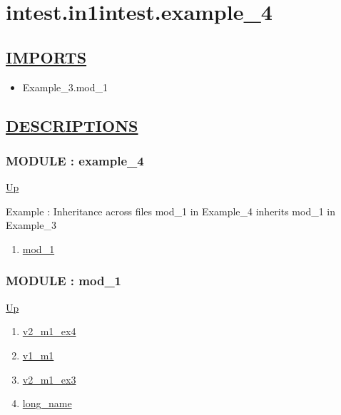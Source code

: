 \chapter*{intest.in1intest.example\_4}
\hypertarget{ecldoc:toc:intest.in1intest.example_4}{}

\section*{\underline{IMPORTS}}
\begin{itemize}
\item Example\_3.mod\_1
\end{itemize}

\section*{\underline{DESCRIPTIONS}}
\subsection*{MODULE : example\_4}
\hypertarget{ecldoc:intest.in1intest.example_4}{}
\par
\begin{minipage}[t]{\textwidth}
\begin{flushleft}
  
\end{flushleft}
\end{minipage}
\hyperlink{ecldoc:toc:intest/in1intest}{Up} \\
\par
Example : Inheritance across files mod\_1 in Example\_4 inherits mod\_1 in Example\_3 \\
\par
\begin{enumerate}
\item \hyperlink{ecldoc:intest.in1intest.example_4.mod_1}{mod\_1}
\end{enumerate}
\subsection*{MODULE : mod\_1}
\hypertarget{ecldoc:intest.in1intest.example_4.mod_1}{}
\par
\begin{minipage}[t]{\textwidth}
\begin{flushleft}
  
\end{flushleft}
\end{minipage}
\hyperlink{ecldoc:intest.in1intest.example_4}{Up} \\
\par
\par
\begin{enumerate}
\item \hyperlink{ecldoc:intest.in1intest.example_4.mod_1.v2_m1_ex4}{v2\_m1\_ex4}
\item \hyperlink{ecldoc:example_3.mod_1.v1_m1}{v1\_m1}
\item \hyperlink{ecldoc:example_3.mod_1.v2_m1_ex3}{v2\_m1\_ex3}
\item \hyperlink{ecldoc:example_3.mod_1.long_name}{long\_name}
\end{enumerate}
